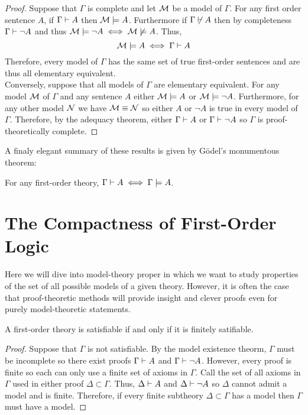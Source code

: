 \documentclass[12pt]{article}
\begin{document}
\begin{proof}
Suppose that $\Gamma$ is complete and let $\mathcal{M}$ be a model of $\Gamma$.
For any first order sentence $A$, if $\Gamma \vdash A$ then $\mathcal{M} \models A$. Furthermore if $\Gamma \not\vdash A$ then by completeness $\Gamma \vdash \neg A$ and thus $\mathcal{M} \models \neg A \iff \mathcal{M} \not\models A$. Thus, 
\[ \mathcal{M} \models A \iff \Gamma \vdash A \]
Therefore, every model of $\Gamma$ has the same set of true first-order sentences and are thus all elementary equivalent. 
\bigskip\\
Conversely, suppose that all models of $\Gamma$ are elementary equivalent. For any model $\mathcal{M}$ of $\Gamma$ and any sentence $A$ either $\mathcal{M} \models A$ or $\mathcal{M} \models \neg A$. Furthermore, for any other model $\mathcal{N}$ we have $\mathcal{M} \equiv \mathcal{N}$ so either $A$ or $\neg A$ is true in every model of $\Gamma$. Therefore, by the adequacy theorem, either $\Gamma \vdash A$ or $\Gamma \vdash \neg A$ so $\Gamma$ is proof-theoretically complete. 
\end{proof}
A finaly elegant summary of these results is given by G\"{o}del's monumentous theorem:

\begin{theorem}[G\"{o}del]
For any first-order theory, $\Gamma \vdash A \iff \Gamma \models A$. 
\end{theorem}

\section{The Compactness of First-Order Logic}

Here we will dive into model-theory proper in which we want to study properties of the set of all possible models of a given theory. However, it is often the case that proof-theoretic methods will provide insight and clever proofs even for purely model-theoretic statements. 


\begin{theorem}[Compactness]
A first-order theory is satisfiable if and only if it is finitely satifiable. 
\end{theorem}

\begin{proof}
Suppose that $\Gamma$ is not satisfiable. By the model existence theorm, $\Gamma$ must be incomplete so there exist proofs $\Gamma \vdash A$ and $\Gamma \vdash \neg A$. However, every proof is finite so each can only use a finite set of axioms in $\Gamma$. Call the set of all axioms in $\Gamma$ used in either proof $\Delta \subset \Gamma$. Thus, $\Delta \vdash A$ and $\Delta \vdash \neg A$ so $\Delta$ cannot admit a model and is finite. Therefore, if every finite subtheory $\Delta \subset \Gamma$ has a model then $\Gamma$ must have a model.
\end{proof}
\end{document}
